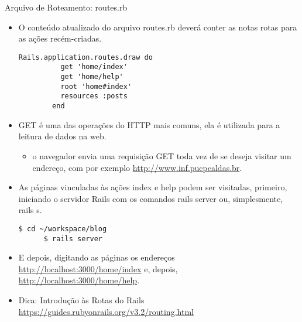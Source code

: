 \begin{frame}{Arquivo de Roteamento: routes.rb}
    \begin{itemize}
      \item O conteúdo atualizado do arquivo \alert{routes.rb} deverá conter as notas rotas 
	para as ações recém-criadas.
	  \begin{lstlisting}[style=RubyInputStyle, caption=config/routes.rb]
	    Rails.application.routes.draw do
	      get 'home/index'
	      get 'home/help'
	      root 'home#index'
	      resources :posts 
	    end 
	  \end{lstlisting}
    
      \item \alert{GET} é uma das operações do HTTP mais comuns, ela é utilizada para a leitura
      de dados na web.
      \begin{itemize}
	\item o navegador envia uma requisição \alert{GET} toda vez de se deseja visitar um endereço, com por exemplo \url{http://www.inf.pucpcaldas.br}. 
       
      \end{itemize}

      \item As páginas vinculadas às ações \alert{index} e \alert{help} podem ser 
	visitadas, primeiro, iniciando o servidor Rails com os comandos \alert{rails server} ou, 
	simplesmente, \alert{rails s}.
	
	\begin{lstlisting}[style=BashInputStyle]
	  $ cd ~/workspace/blog
	  $ rails server
	\end{lstlisting}
    
      \item E depois, digitando as páginas os endereços \alert{\url{http://localhost:3000/home/index}} e, depois, \alert{\url{http://localhost:3000/home/help}}.
      \item Dica: Introdução às Rotas do Rails \url{https://guides.rubyonrails.org/v3.2/routing.html}
    \end{itemize}
    
\end{frame}

